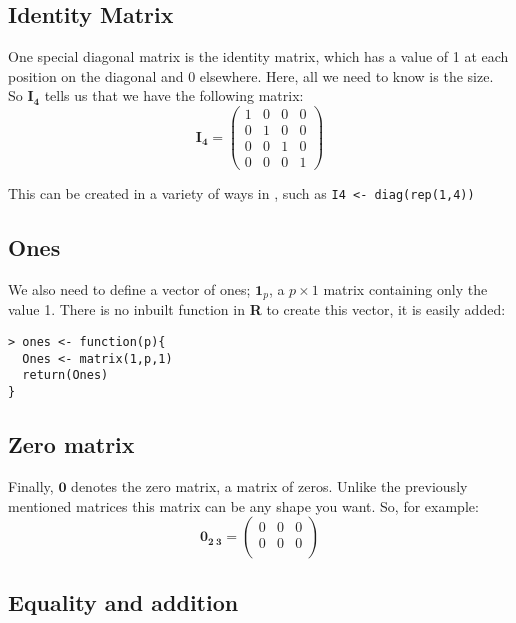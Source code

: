 \subsection{Identity Matrix}

One special diagonal matrix is the identity matrix, which has a value of 1 at each position on the diagonal and 0 elsewhere.   Here, all we need to know is the size.   So $\mathbf{I_{4}}$ tells us that we have the following matrix:
\begin{displaymath}
\mathbf{I_{4}} = 
\left( \begin{array}{rrrr}
1 & 0 & 0 & 0\\
0 & 1 &  0 & 0\\
0 & 0 & 1 & 0\\
0 & 0 & 0 & 1
\end{array}
\right)
\end{displaymath}

This can be created in a variety of ways in \R, such as \verb+I4 <- diag(rep(1,4))+

\subsection{Ones}

We also need to define a vector of ones; $\boldsymbol{1}_{p}$, a $p \times 1$ matrix containing only the value 1.   There is no inbuilt function in \textbf{R} to create this vector, it is easily added:
\singlespacing
\begin{verbatim}
> ones <- function(p){
  Ones <- matrix(1,p,1)
  return(Ones)
}
\end{verbatim}
\onehalfspacing

\subsection{Zero matrix}

Finally, $\mathbf{0}$ denotes the zero matrix, a matrix of zeros.   Unlike the previously mentioned matrices this matrix can be any shape you want.   So, for example:
\begin{displaymath}
\mathbf{0_{2\ 3}} = 
\left( \begin{array}{rrr}
0 & 0 & 0 \\
0 & 0 &  0 \\
\end{array}
\right)
\end{displaymath}


\subsection{Equality and addition}
\label{matrixaddition}

